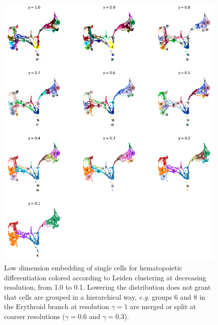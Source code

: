 \documentclass[11pt, titlepage, twoside]{article}
\begin{document}
\begin{figure}[htbp]
\centering
\includegraphics[keepaspectratio,width=\textwidth,height=0.75\textheight]{Figure_Paul15_Leiden_r.png}
\caption[]{Low dimension embedding of single cells for hematopoietic differentiation colored according to Leiden clustering at decreasing resolution, from 1.0 to 0.1. Lowering the distribution does not grant that cells are grouped in a hierarchical way, \emph{e.g.} groups 6 and 8 in the Erythroid branch at resolution $\gamma=1$ are merged or split at coarser resolutions ($\gamma=0.6$ and $\gamma=0.3$).}\label{Figure_Paul15_Leiden_r}
\end{figure}
\clearpage
\end{document}
